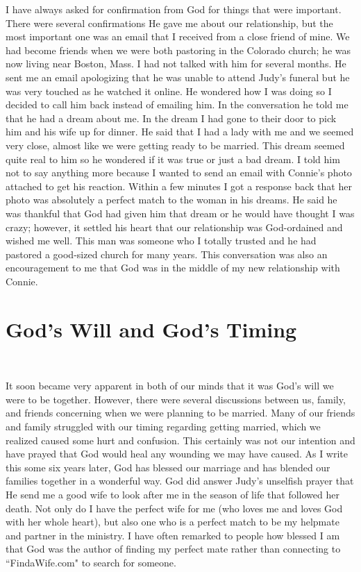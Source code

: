 \documentclass[oneside,12pt]{book}
\begin{document}
I have always asked for confirmation from God for things that were important. There were several confirmations He gave me about our relationship, but the most important one was an email that I received from a close friend of mine. We had become friends when we were both pastoring in the Colorado church; he was now living near Boston, Mass. I had not talked with him for several months. He sent me an email apologizing that he was unable to attend Judy's funeral but he was very touched as he watched it online. He wondered how I was doing so I decided to call him back instead of emailing him. In the conversation he told me that he had a dream about me. In the dream I had gone to their door to pick him and his wife up for dinner. He said that I had a lady with me and we seemed very close, almost like we were getting ready to be married. This dream seemed quite real to him so he wondered if it was true or just a bad dream. I told him not to say anything more because I wanted to send an email with Connie's photo attached to get his reaction. Within a few minutes I got a response back that her photo was absolutely a perfect match to the woman in his dreams. He said he was thankful that God had given him that dream or he would have thought I was crazy; however, it settled his heart that our relationship was God-ordained and wished me well. This man was someone who I totally trusted and he had pastored a good-sized church for many years. This conversation was also an encouragement to me that God was in the middle of my new relationship with Connie.


\section{God's Will and God's Timing}
\

It soon became very apparent in both of our minds that it was God's will we were to be together. However, there were several discussions between us, family, and friends concerning when we were planning to be married. Many of our friends and family struggled with our timing regarding getting married, which we realized caused some hurt and confusion. This certainly was not our intention and have prayed that God would heal any wounding we may have caused. As I write this some six years later, God has blessed our marriage and has blended our families together in a wonderful way. God did answer Judy's unselfish prayer that He send me a good wife to look after me in the season of life that followed her death. Not only do I have the perfect wife for me (who loves me and loves God with her whole heart), but also one who is a perfect match to be my helpmate and partner in the ministry. I have often remarked to people how blessed I am that God was the author of finding my perfect mate rather than connecting to ``FindaWife.com" to search for someone.
\end{document}
